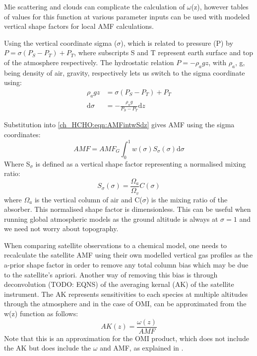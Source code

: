     Mie scattering and clouds can complicate the calculation of $\omega$(z), however tables of values for this function at various parameter inputs can be used with modeled vertical shape factors for local AMF calculations.
    
    Using the vertical coordinate sigma ($\sigma$), which is related to pressure (P) by $P=\sigma \left( P_S - P_T \right) + P_T$, where subscripts S and T represent earth surface and top of the atmosphere respectively.
    The hydrostatic relation $P = - \rho_a g z$, with $\rho_a$, g, being density of air, gravity, respectively lets us switch to the sigma coordinate using:
    \begin{align*}
      \rho_a g z & = \sigma \left( P_S - P_T \right) + P_T \\
      \mathrm{d}\sigma  & = - \frac{ \rho_a g }{ P_S - P_T } \mathrm{d}z
    \end{align*}
    
    Substitution into \ref{ch_HCHO:eqn:AMFintwSdz} gives AMF using the sigma coordinates:
    \begin{equation} \label{ch_HCHO:eqn:AMFintwSdsigma}
      AMF = AMF_G \int_0^1 w(\sigma) S_\sigma(\sigma) \mathrm{d}\sigma
    \end{equation}
    Where S$_\sigma$ is defined as a vertical shape factor representing a normalised mixing ratio:
    \begin{equation}
      S_\sigma (\sigma) = \frac{\Omega_a}{\Omega_v}C(\sigma)
    \end{equation}
    where $\Omega_a$ is the vertical column of air and C($\sigma$) is the mixing ratio of the absorber.
    This normalised shape factor is dimensionless.
    This can be useful when running global atmospheric models as the ground altitude is always at $\sigma=1$ and we need not worry about topography.
    
    When comparing satellite observations to a chemical model, one needs to recalculate the satellite AMF using their own modelled vertical gas profiles as the a-prior shape factor in order to remove any total column bias which may be due to the satellite's apriori.
    Another way of removing this bias is through deconvolution (TODO: EQNS) of the averaging kernal (AK) of the satellite instrument.
    The AK represents sensitivities to each species at multiple altitudes through the atmosphere and in the case of OMI, can be approximated from the w(z) function as follows:
    \begin{equation} \label{ch_HCHO:eqn:AKfromw}
      AK(z) = \frac{\omega(z)}{AMF}
    \end{equation}
    Note that this is an approximation for the OMI product, which does not include the AK but does include the $\omega$ and AMF, as explained in \citet{Abad2015}.
    
